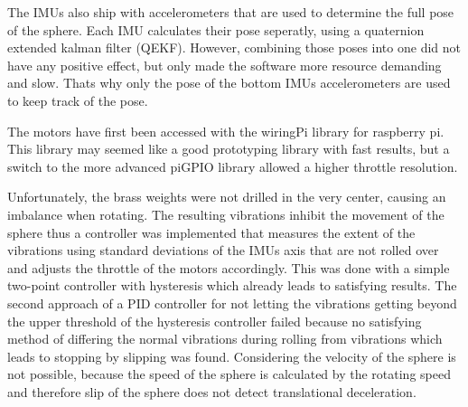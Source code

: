 The IMUs also ship with accelerometers that are used to determine the full pose of the sphere. Each IMU calculates their pose seperatly, using a quaternion extended kalman filter (QEKF). However, combining those poses into one did not have any positive effect, but only made the software more resource demanding and slow. Thats why only the pose of the bottom IMUs accelerometers are used to keep track of the pose.

The motors have first been accessed with the wiringPi library for raspberry pi. This library may seemed like a good prototyping library with fast results, but a switch to the more advanced piGPIO library allowed a higher throttle resolution. 

Unfortunately, the brass weights were not drilled in the very center, causing an imbalance when rotating. The resulting vibrations inhibit the movement of the sphere thus a controller was implemented that measures the extent of the vibrations using standard deviations of the IMUs axis that are not rolled over and adjusts the throttle of the motors accordingly. This was done with a simple two-point controller with hysteresis which already leads to satisfying results. The second approach of a PID controller for not letting the vibrations getting beyond the upper threshold of the hysteresis controller failed because no satisfying method of differing the normal vibrations during rolling from vibrations which leads to stopping by slipping was found. Considering the velocity of the sphere is not possible, because the speed of the sphere is calculated by the rotating speed and therefore slip of the sphere does not detect translational deceleration. 




